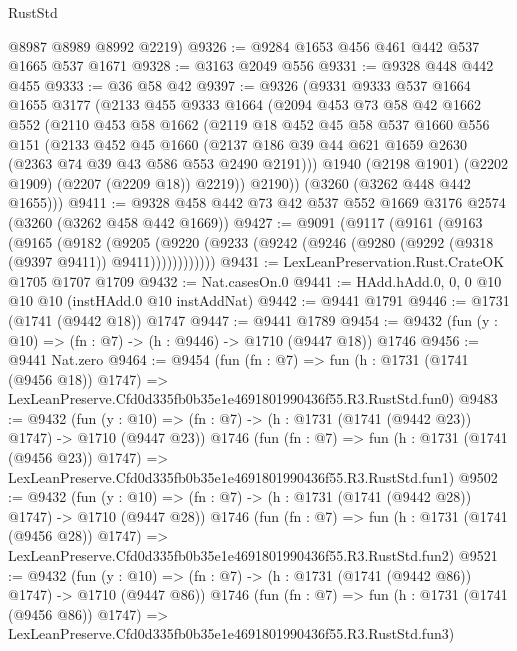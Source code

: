 \begin{lexlean}{RustStd}
\begin{coremodule}
      @8987
      @8989
      @8992
      @2219)
@9326 := @9284 @1653 @456 @461 @442 @537 @1665 @537 @1671
@9328 := @3163 @2049 @556
@9331 := @9328 @448 @442 @455
@9333 := @36 @58 @42
@9397 := @9326
    (@9331
      @9333
      @537
      @1664
      @1655
      @3177
      (@2133
        @455
        @9333
        @1664
        (@2094
          @453
          @73
          @58
          @42
          @1662
          @552
          (@2110
            @453
            @58
            @1662
            (@2119
              @18
              @452
              @45
              @58
              @537
              @1660
              @556
              @151
              (@2133
                @452
                @45
                @1660
                (@2137 @186 @39 @44 @621 @1659 @2630 (@2363 @74 @39 @43 @586 @553 @2490 @2191)))
              @1940
              (@2198 @1901)
              (@2202 @1909)
              (@2207 (@2209 @18))
              @2219))
          @2190))
      (@3260 (@3262 @448 @442 @1655)))
@9411 := @9328 @458 @442 @73 @42 @537 @552 @1669 @3176 @2574 (@3260 (@3262 @458 @442 @1669))
@9427 := @9091
    (@9117
      (@9161
        (@9163
          (@9165
            (@9182
              (@9205
                (@9220 (@9233 (@9242 (@9246 (@9280 (@9292 (@9318 (@9397 @9411)) @9411))))))))))))
@9431 := LexLeanPreservation.Rust.CrateOK @1705 @1707 @1709
@9432 := Nat.casesOn.{0}
@9441 := HAdd.hAdd.{0, 0, 0} @10 @10 @10 (instHAdd.{0} @10 instAddNat)
@9442 := @9441 @1791
@9446 := @1731 (@1741 (@9442 @18)) @1747
@9447 := @9441 @1789
@9454 := @9432 (fun (y : @10) => (fn : @7) -> (h : @9446) -> @1710 (@9447 @18)) @1746
@9456 := @9441 Nat.zero
@9464 := @9454
    (fun (fn : @7) =>
    fun (h : @1731 (@1741 (@9456 @18)) @1747) =>
    LexLeanPreserve.Cfd0d335fb0b35e1e4691801990436f55.R3.RustStd.fun0)
@9483 := @9432
    (fun (y : @10) => (fn : @7) -> (h : @1731 (@1741 (@9442 @23)) @1747) -> @1710 (@9447 @23))
    @1746
    (fun (fn : @7) =>
    fun (h : @1731 (@1741 (@9456 @23)) @1747) =>
    LexLeanPreserve.Cfd0d335fb0b35e1e4691801990436f55.R3.RustStd.fun1)
@9502 := @9432
    (fun (y : @10) => (fn : @7) -> (h : @1731 (@1741 (@9442 @28)) @1747) -> @1710 (@9447 @28))
    @1746
    (fun (fn : @7) =>
    fun (h : @1731 (@1741 (@9456 @28)) @1747) =>
    LexLeanPreserve.Cfd0d335fb0b35e1e4691801990436f55.R3.RustStd.fun2)
@9521 := @9432
    (fun (y : @10) => (fn : @7) -> (h : @1731 (@1741 (@9442 @86)) @1747) -> @1710 (@9447 @86))
    @1746
    (fun (fn : @7) =>
    fun (h : @1731 (@1741 (@9456 @86)) @1747) =>
    LexLeanPreserve.Cfd0d335fb0b35e1e4691801990436f55.R3.RustStd.fun3)

\end{coremodule}
\end{lexlean}
